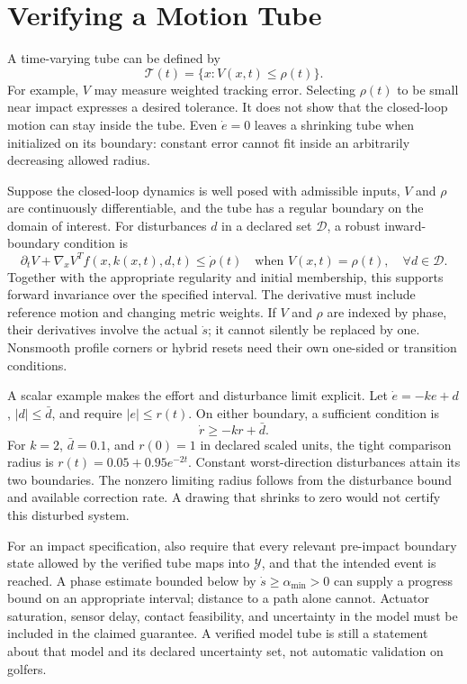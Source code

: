 \documentclass[12pt, openany]{book}
\theoremstyle{plain}
\begin{document}
\section{Verifying a Motion Tube}

A time-varying tube can be defined by
\begin{equation}
 \mathcal T(t)=\{x:V(x,t)\leq\rho(t)\}.
 \label{eq:motion_tube}
\end{equation}
For example, $V$ may measure weighted tracking error. Selecting $\rho(t)$ to
be small near impact expresses a desired tolerance. It does not show that the
closed-loop motion can stay inside the tube. Even $\dot e=0$ leaves a shrinking
tube when initialized on its boundary: constant error cannot fit inside an
arbitrarily decreasing allowed radius.

Suppose the closed-loop dynamics is well posed with admissible inputs,
$V$ and $\rho$ are continuously differentiable, and the tube has a regular
boundary on the domain of interest. For disturbances $d$ in a declared set
$\mathcal D$, a robust inward-boundary condition is
\begin{equation}
 \partial_t V+\nabla_x V^Tf(x,k(x,t),d,t)\leq\dot\rho(t)
 \quad\text{when }V(x,t)=\rho(t),\quad\forall d\in\mathcal D.
 \label{eq:motion_tube_boundary}
\end{equation}
Together with the appropriate regularity and initial membership, this supports
forward invariance over the specified interval. The derivative must include
reference motion and changing metric weights. If $V$ and $\rho$ are indexed
by phase, their derivatives involve the actual $\dot s$; it cannot silently
be replaced by one. Nonsmooth profile corners or hybrid resets need their own
one-sided or transition conditions.

A scalar example makes the effort and disturbance limit explicit. Let
$\dot e=-ke+d$, $|d|\leq\bar d$, and require $|e|\leq r(t)$. On either boundary,
a sufficient condition is
\begin{equation}
 \dot r\geq-kr+\bar d.
 \label{eq:motion_radius_condition}
\end{equation}
For $k=2$, $\bar d=0.1$, and $r(0)=1$ in declared scaled units, the tight
comparison radius is $r(t)=0.05+0.95e^{-2t}$. Constant worst-direction
disturbances attain its two boundaries. The nonzero limiting radius follows
from the disturbance bound and available correction rate. A drawing that
shrinks to zero would not certify this disturbed system.

For an impact specification, also require that every relevant pre-impact
boundary state allowed by the verified tube maps into $\mathcal Y$, and that
the intended event is reached. A phase estimate bounded below by
$\dot s\geq\alpha_{\min}>0$ can supply a progress bound on an appropriate
interval; distance to a path alone cannot. Actuator saturation, sensor delay,
contact feasibility, and uncertainty in the model must be included in the
claimed guarantee. A verified model tube is still a statement about that model
and its declared uncertainty set, not automatic validation on golfers.
\end{document}
